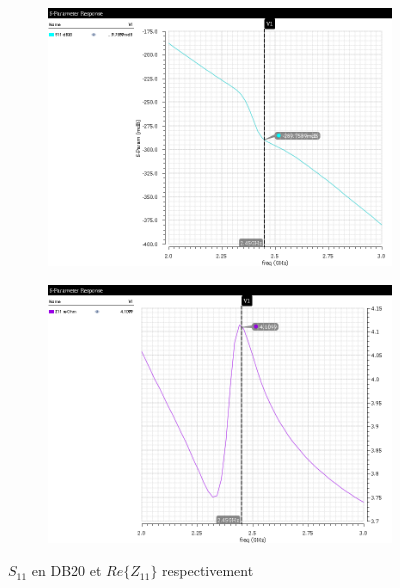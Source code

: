 \documentclass[a4paper]{article}
\begin{document}
\begin{figure}[!htb]
  \begin{subfigure}[t]{.5\linewidth}
      \centering
      \includegraphics[width=1.1\linewidth]{Q2-dB20-notadapted.png}
      \label{fig:nonadaptedDB20}
  \end{subfigure}%
  \begin{subfigure}[t]{.5\linewidth}
    \centering
    \includegraphics[width=1.1\linewidth]{Q2-realZ11-notadapted.png}
    \label{fig:nonadaptedrealZ11}
  \end{subfigure}%
  \caption{$S_{11}$ en DB20 et $Re\{Z_{11}\}$ respectivement}
  \label{fig:nonadaptedrealZ11-DB20}
\end{figure}
\end{document}
